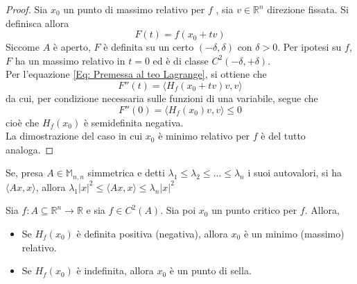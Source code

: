 \begin{proof}
    Sia $x_0$ un punto di massimo relativo per $f$ , sia $v \in \mathbb{R}^n$ direzione fissata. Si definisca allora
    \begin{equation*}
    F(t)=f(x_0+tv)
    \end{equation*}
    Siccome $A$ è aperto, $F$ è definita su un certo $\left(-\delta, \delta\right)$ con $\delta>0$. Per ipotesi su $f$, $F$ ha un massimo relativo in $t=0$ ed è di classe $C^2(-\delta, +\delta)$.\\
    Per l'equazione \eqref{Eq: Premessa al teo Lagrange}, si ottiene che
    \begin{equation*}
        F''(t)= \langle H_f(x_0+tv)v, v \rangle 
    \end{equation*}
    da cui, per condizione necessaria sulle funzioni di una variabile, segue che
    \begin{equation*}
        F''(0)= \langle H_f(x_0)v, v \rangle \leq 0
    \end{equation*}
    cioè che $H_f(x_0)$ è semidefinita negativa.\\
    La dimostrazione del caso in cui $x_0$ è minimo relativo per $f$ è del tutto analoga.
\end{proof}
\begin{lemma} \label{Lemma: FQ di matrice simmetrica è compresa tra i suoi autovalori max e min}
        Se, presa $A \in \mathbb{M}_{n,n}$ simmetrica e detti $\lambda_1 \leq \lambda_2 \leq \dots \leq \lambda_n$ i suoi autovalori, si ha $\langle Ax, x \rangle$, allora $\lambda_1 |x|^2 \leq \langle Ax, x \rangle \leq \lambda_n |x|^2$
\end{lemma}
\begin{theorem} \label{Teo: Condizione sufficiente del secondo ordine}
    Sia $f:A \subseteq \mathbb{R}^n \to \mathbb{R}$ e sia $f \in C^2(A)$. Sia poi $x_0$ un punto critico per $f$. Allora, 
    \begin{itemize}
        \item Se $H_f(x_0)$ è definita positiva (negativa), allora $x_0$ è un minimo (massimo) relativo.
        \item Se $H_f(x_0)$ è indefinita, allora $x_0$ è un punto di sella.
    \end{itemize}
\end{theorem}
